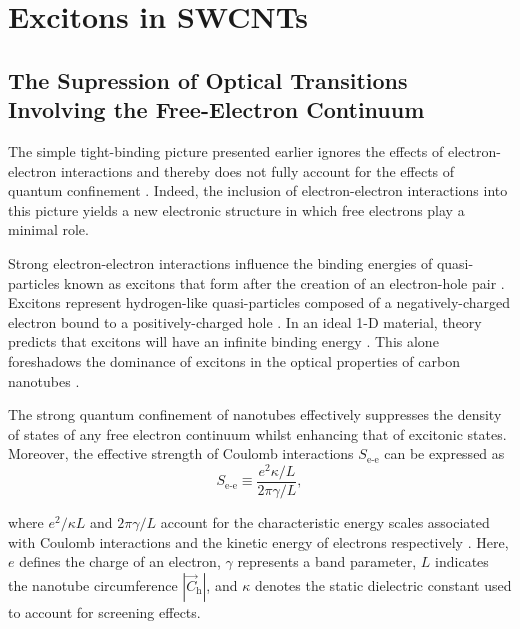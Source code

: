 \section{Excitons in SWCNTs}

\subsection{The Supression of Optical Transitions Involving the Free-Electron Continuum}
The simple tight-binding picture presented earlier ignores the effects of electron-electron interactions and thereby does not fully account for the effects of quantum confinement \cite{weismanKonoBook}. Indeed, the inclusion of electron-electron interactions into this picture yields a new electronic structure in which free electrons play a minimal role.

Strong electron-electron interactions influence the binding energies of quasi-particles known as excitons that form after the creation of an electron-hole pair \cite{koch2006semiconductor}. Excitons represent hydrogen-like quasi-particles composed of a negatively-charged electron bound to a positively-charged hole \cite{koch2006semiconductor}. In an ideal 1-D material, theory predicts that excitons will have an infinite binding energy \cite{ando2005theory}. This alone foreshadows the dominance of excitons in the optical properties of carbon nanotubes \cite{ando2005theory}.



The strong quantum confinement of nanotubes effectively suppresses the density of states of any free electron continuum whilst enhancing that of excitonic states. Moreover, the effective strength of Coulomb interactions $S_\text{e-e}$ can be expressed as
\begin{equation}
	S_\text{e-e} \equiv \dfrac{e^2 \kappa / L}{2 \pi \gamma / L},
\end{equation}

where $e^2 /\kappa L$ and $2 \pi \gamma / L$ account for the characteristic energy scales associated with Coulomb interactions and the kinetic energy of electrons respectively \cite{ando2005theory}. Here, $e$ defines the charge of an electron, $\gamma$ represents a band parameter, $L$ indicates the nanotube circumference $|\vec{C}_\text{h}|$, and $\kappa$ denotes the static dielectric constant used to account for screening effects.

